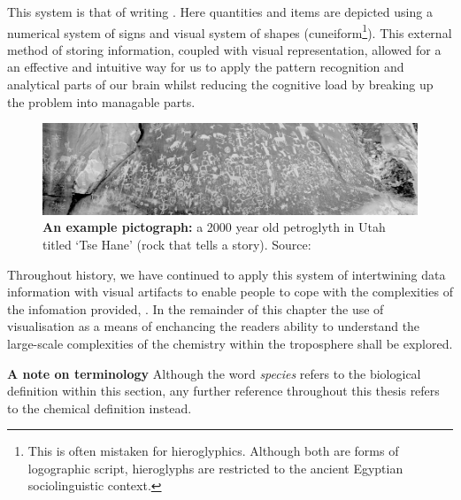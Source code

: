 This system is that of writing \cite{archaic,beforeCuneiform}. Here quantities and items are depicted using a numerical system of signs and visual system of shapes (cuneiform\footnote{This is often mistaken for hieroglyphics. Although both are forms of logographic script, hieroglyphs are restricted to the ancient Egyptian sociolinguistic context. }). This external method of storing information, coupled with visual representation, allowed for a an effective and intuitive way for us to apply the pattern recognition and analytical parts of our brain whilst reducing the cognitive load by breaking up the problem into managable parts. 


\begin{figure}[H]
         \centering
         \includegraphics[width=\textwidth]{figures_c1/newspaperrock.jpg}
        \caption{\textbf{An example pictograph:} a 2000 year old petroglyth in Utah titled `Tse Hane' (rock that tells a story). Source:
        \cite{newspaperrock} }
        \label{cave}
\end{figure}

Throughout history, we have continued to apply this system of intertwining data information with visual artifacts to enable people to cope with the complexities of the infomation provided, \cite{tufte}. In the remainder of this chapter the use of visualisation as a means of enchancing the readers ability to understand the large-scale complexities of the chemistry within the troposphere shall be explored. 


\textbf{A note on terminology}
Although the word \emph{species} refers to the biological definition within this section, any further reference throughout this thesis refers to the chemical definition instead. 





